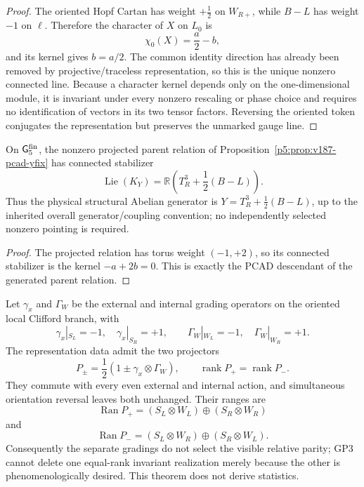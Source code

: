 \documentclass[12pt,a4paper]{article}
\begin{document}
\begin{proof}
The oriented Hopf Cartan has weight \(+\tfrac12\) on \(W_{R+}\), while
\(B-L\) has weight \(-1\) on \(\ell\).  Therefore the character of \(X\) on
\(L_0\) is
\[
 \chi_0(X)=\frac a2-b,
\]
and its kernel gives \(b=a/2\).  The common identity direction
has already been removed by projective/traceless representation, so this is
the unique nonzero connected line.  Because a character kernel depends only
on the one-dimensional module, it is invariant under every nonzero rescaling
or phase choice and requires no identification of vectors in its two tensor
factors.  Reversing the oriented token conjugates the representation but
preserves the unmarked gauge line.
\end{proof}

\begin{corollary}
\label{p5:cor:yfix-hypercharge}
On \(\mathsf G_5^{\rm fin}\), the nonzero projected parent relation of
Proposition~\ref{p5:prop:v187-pcad-yfix} has connected stabilizer
\[
 \operatorname{Lie}(K_Y)
 =\mathbb R\!\left(T_R^3+\frac12(B-L)\right).
\]
Thus the physical structural Abelian generator is
\(Y=T_R^3+\tfrac12(B-L)\), up to the inherited overall generator/coupling
convention; no independently selected nonzero pointing is required.
\end{corollary}
\begin{proof}
The projected relation has torus weight \((-1,+2)\), so its connected
stabilizer is the kernel \(-a+2b=0\).  This is exactly the PCAD descendant of
the generated parent relation.
\end{proof}

\begin{theorem}
\label{p5:thm:generated-orientation-coherent-chirality}
Let \(\gamma_x\) and \(\Gamma_W\) be the external and internal grading
operators on the oriented local Clifford branch, with
\[
 \gamma_x|_{S_L}=-1,\quad\gamma_x|_{S_R}=+1,\qquad
 \Gamma_W|_{W_L}=-1,\quad\Gamma_W|_{W_R}=+1 .
\]
The representation data admit the two projectors
\[
 P_\pm=\frac12(1\pm\gamma_x\otimes\Gamma_W),
\qquad
\operatorname{rank}P_+=\operatorname{rank}P_-.
\]
They commute with every even external and internal action, and simultaneous
orientation reversal leaves both unchanged.  Their ranges are
\[
 \operatorname{Ran}P_+
 =(S_L\otimes W_L)\oplus(S_R\otimes W_R)
\]
and
\[
\operatorname{Ran}P_-
=(S_L\otimes W_R)\oplus(S_R\otimes W_L).
\]
Consequently the separate gradings do not select the visible relative parity;
GP3 cannot delete one equal-rank invariant realization merely because the
other is phenomenologically desired.  This theorem does not derive
statistics.
\end{theorem}
\end{document}
